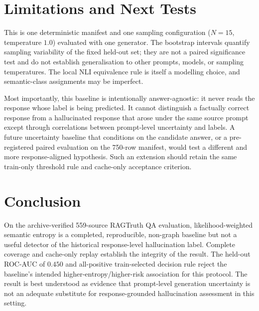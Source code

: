 \documentclass[11pt,a4paper]{article}
\begin{document}
\section{Limitations and Next Tests}

This is one deterministic manifest and one sampling configuration ($N=15$, temperature $1.0$) evaluated with one generator.  The bootstrap intervals quantify sampling variability of the fixed held-out set; they are not a paired significance test and do not establish generalisation to other prompts, models, or sampling temperatures.  The local NLI equivalence rule is itself a modelling choice, and semantic-class assignments may be imperfect.

Most importantly, this baseline is intentionally answer-agnostic: it never reads the response whose label is being predicted.  It cannot distinguish a factually correct response from a hallucinated response that arose under the same source prompt except through correlations between prompt-level uncertainty and labels.  A future uncertainty baseline that conditions on the candidate answer, or a pre-registered paired evaluation on the 750-row manifest, would test a different and more response-aligned hypothesis.  Such an extension should retain the same train-only threshold rule and cache-only acceptance criterion.

\section{Conclusion}

On the archive-verified 559-source RAGTruth QA evaluation, likelihood-weighted semantic entropy is a completed, reproducible, non-graph baseline but not a useful detector of the historical response-level hallucination label.  Complete coverage and cache-only replay establish the integrity of the result.  The held-out ROC-AUC of $0.450$ and all-positive train-selected decision rule reject the baseline's intended higher-entropy/higher-risk association for this protocol.  The result is best understood as evidence that prompt-level generation uncertainty is not an adequate substitute for response-grounded hallucination assessment in this setting.
\end{document}
